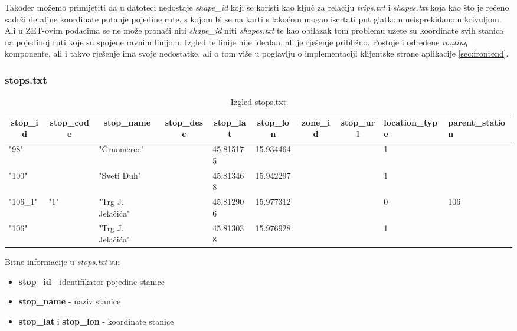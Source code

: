 \documentclass[zavrsnirad]{fer}
\begin{document}
Također možemo primijetiti da u datoteci nedostaje \textit{shape\_id} koji se koristi kao ključ za relaciju \textit{trips.txt} i \textit{shapes.txt} koja kao što je rečeno sadrži detaljne koordinate putanje pojedine rute, s kojom bi se na karti s lakoćom mogao iscrtati put glatkom neisprekidanom krivuljom.
Ali u ZET-ovim podacima se ne može pronaći niti \textit{shape\_id} niti \textit{shapes.txt} te kao obilazak tom problemu uzete su koordinate svih stanica na pojedinoj ruti koje su spojene ravnim linijom. Izgled te linije nije idealan, ali je rješenje približno. Postoje i određene \textit{routing} komponente, ali i takvo rješenje ima svoje nedostatke, ali o tom više u poglavlju o implementaciji klijentske strane aplikacije \ref{sec:frontend}.

\subsubsection{stops.txt}

\begin{table}[htb]
	\begin{adjustbox}{width=\columnwidth,center}
	\begin{tabular}{l|l|l|l|l|l|l|l|l|l}
		\hline
		\multicolumn{1}{c|}{\textbf{stop\_id}} & \multicolumn{1}{c|}{\textbf{stop\_code}} & \multicolumn{1}{c|}{\textbf{stop\_name}} & \multicolumn{1}{c|}{\textbf{stop\_desc}} & \multicolumn{1}{c|}{\textbf{stop\_lat}} & \multicolumn{1}{c|}{\textbf{stop\_lon}} & \multicolumn{1}{c|}{\textbf{zone\_id}} & \multicolumn{1}{c|}{\textbf{stop\_url}} & \textbf{location\_type} & \textbf{parent\_station} \\ \hline
		"98" &  & "Črnomerec" &  & 45.815175 & 15.934464 &  &  & 1 &  \\ \hline
		"100" &  & "Sveti Duh" &  & 45.813468 & 15.942297 &  &  & 1 &  \\ \hline
		"106\_1" & "1" & "Trg J. Jelačića" &  & 45.812906 & 15.977312 &  &  & 0 & 106 \\ \hline
		"106" &  & "Trg J. Jelačića" &  & 45.813038 & 15.976928 &  &  & 1 &  \\ \hline
	\end{tabular}
	\end{adjustbox}
	\caption{Izgled stops.txt}
	\label{tbl:stops}
\end{table}

Bitne informacije u \textit{stops.txt} su:
\begin{itemize}
	\item \textbf{stop\_id} - identifikator pojedine stanice
	\item \textbf{stop\_name} - naziv stanice
	\item \textbf{stop\_lat} i \textbf{stop\_lon} - koordinate stanice
\end{itemize}
\end{document}
